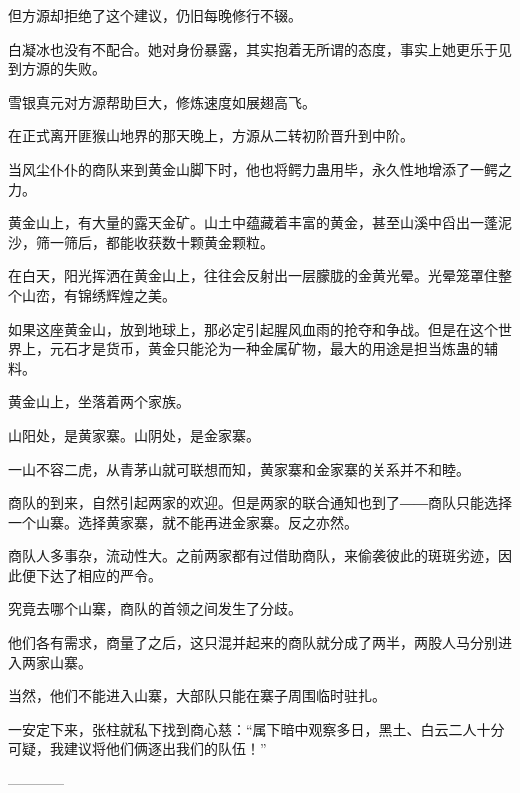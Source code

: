 \begin{this_body}
但方源却拒绝了这个建议，仍旧每晚修行不辍。

白凝冰也没有不配合。她对身份暴露，其实抱着无所谓的态度，事实上她更乐于见到方源的失败。

雪银真元对方源帮助巨大，修炼速度如展翅高飞。

在正式离开匪猴山地界的那天晚上，方源从二转初阶晋升到中阶。

当风尘仆仆的商队来到黄金山脚下时，他也将鳄力蛊用毕，永久性地增添了一鳄之力。

黄金山上，有大量的露天金矿。山土中蕴藏着丰富的黄金，甚至山溪中舀出一蓬泥沙，筛一筛后，都能收获数十颗黄金颗粒。

在白天，阳光挥洒在黄金山上，往往会反射出一层朦胧的金黄光晕。光晕笼罩住整个山峦，有锦绣辉煌之美。

如果这座黄金山，放到地球上，那必定引起腥风血雨的抢夺和争战。但是在这个世界上，元石才是货币，黄金只能沦为一种金属矿物，最大的用途是担当炼蛊的辅料。

黄金山上，坐落着两个家族。

山阳处，是黄家寨。山阴处，是金家寨。

一山不容二虎，从青茅山就可联想而知，黄家寨和金家寨的关系并不和睦。

商队的到来，自然引起两家的欢迎。但是两家的联合通知也到了――商队只能选择一个山寨。选择黄家寨，就不能再进金家寨。反之亦然。

商队人多事杂，流动性大。之前两家都有过借助商队，来偷袭彼此的斑斑劣迹，因此便下达了相应的严令。

究竟去哪个山寨，商队的首领之间发生了分歧。

他们各有需求，商量了之后，这只混并起来的商队就分成了两半，两股人马分别进入两家山寨。

当然，他们不能进入山寨，大部队只能在寨子周围临时驻扎。

一安定下来，张柱就私下找到商心慈：“属下暗中观察多日，黑土、白云二人十分可疑，我建议将他们俩逐出我们的队伍！”

------------

\end{this_body}

